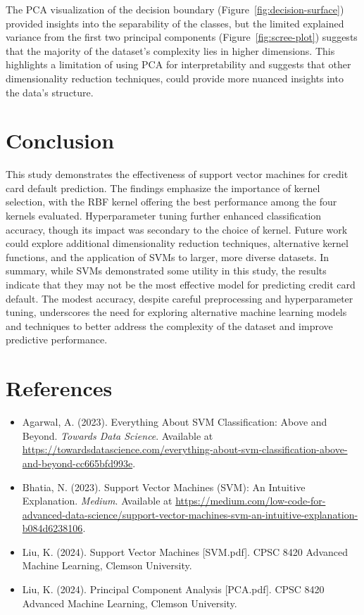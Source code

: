 \documentclass{article}
\begin{document}
The PCA visualization of the decision boundary (Figure~\ref{fig:decision-surface}) provided insights into the separability of the classes, but the limited explained variance from the first two principal components (Figure~\ref{fig:scree-plot}) 
suggests that the majority of the dataset's complexity lies in higher dimensions. This highlights a limitation of using PCA for interpretability and suggests that other dimensionality reduction techniques, could provide more nuanced insights into the data's structure.

\section{Conclusion}
This study demonstrates the effectiveness of support vector machines for credit card default prediction. The findings emphasize the importance of kernel selection, with the RBF kernel offering the best performance among the four kernels evaluated. 
Hyperparameter tuning further enhanced classification accuracy, though its impact was secondary to the choice of kernel. Future work could explore additional dimensionality reduction techniques, alternative kernel functions, and the application of SVMs to larger, more diverse datasets.
In summary, while SVMs demonstrated some utility in this study, the results indicate that they may not be the most effective model for predicting credit card default. The modest accuracy, despite careful preprocessing and hyperparameter tuning, 
underscores the need for exploring alternative machine learning models and techniques to better address the complexity of the dataset and improve predictive performance.

\section*{References}
\begin{itemize}
    \item Agarwal, A. (2023). Everything About SVM Classification: Above and Beyond. \textit{Towards Data Science}. Available at \url{https://towardsdatascience.com/everything-about-svm-classification-above-and-beyond-cc665bfd993e}.
    \item Bhatia, N. (2023). Support Vector Machines (SVM): An Intuitive Explanation. \textit{Medium}. Available at \url{https://medium.com/low-code-for-advanced-data-science/support-vector-machines-svm-an-intuitive-explanation-b084d6238106}.
    \item Liu, K. (2024). Support Vector Machines [SVM.pdf]. CPSC 8420 Advanced Machine Learning, Clemson University.
    \item Liu, K. (2024). Principal Component Analysis [PCA.pdf]. CPSC 8420 Advanced Machine Learning, Clemson University.
\end{itemize}
\end{document}

